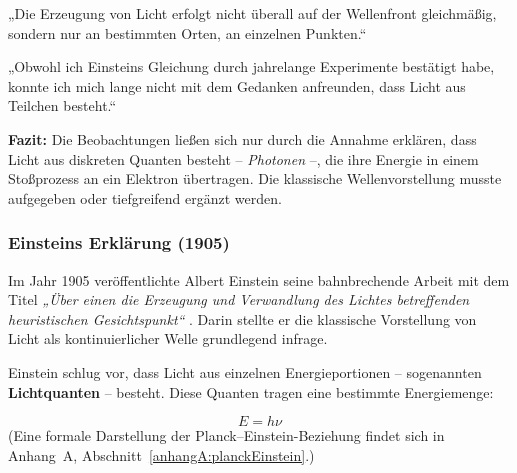 \vspace{1em}
\begin{tcolorbox}[physikbox, title=Albert Einstein (1905)\textit{ \cite{einstein1905}} ]
	\label{die Erzeuguung von Licht}
	\small
	„Die Erzeugung von Licht erfolgt nicht überall auf der Wellenfront gleichmäßig, sondern nur an bestimmten Orten, an einzelnen Punkten.“
\end{tcolorbox}

\vspace{1em}
\begin{tcolorbox}[physikbox, title=Robert A. Millikan (1916)\textit{ \cite{millikan1916}}]
	\label{box:Robert A, Millikan}
	\small
	„Obwohl ich Einsteins Gleichung durch jahrelange Experimente bestätigt habe, konnte ich mich lange nicht mit dem Gedanken anfreunden, dass Licht aus Teilchen besteht.“
\end{tcolorbox}
\vspace{1em}

\textbf{Fazit:} Die Beobachtungen ließen sich nur durch die Annahme erklären, dass Licht aus diskreten Quanten besteht – \emph{Photonen} –, die ihre Energie in einem Stoßprozess an ein Elektron übertragen. Die klassische Wellenvorstellung musste aufgegeben oder tiefgreifend ergänzt werden.
\subsubsection{Einsteins Erklärung (1905)}

Im Jahr 1905 veröffentlichte Albert Einstein seine bahnbrechende Arbeit mit dem Titel \textit{„Über einen die Erzeugung und Verwandlung des Lichtes betreffenden heuristischen Gesichtspunkt“} \cite{einstein1905}. Darin stellte er die klassische Vorstellung von Licht als kontinuierlicher Welle grundlegend infrage.

Einstein schlug vor, dass Licht aus einzelnen Energieportionen – sogenannten \textbf{Lichtquanten} – besteht. Diese Quanten tragen eine bestimmte Energiemenge:

\[
E = h \nu
\]
(Eine formale Darstellung der Planck–Einstein-Beziehung findet sich in Anhang~A, Abschnitt~\ref{anhangA:planckEinstein}.)

